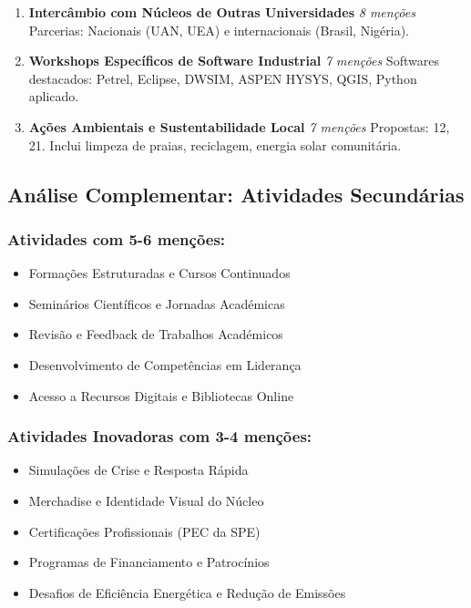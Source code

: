 \documentclass[12pt,a4paper]{article}
\begin{document}
\begin{enumerate}[itemsep=0.3cm, font=\bfseries]
\item \textbf{Intercâmbio com Núcleos de Outras Universidades} \quad \textit{8 menções}
\newline Parcerias: Nacionais (UAN, UEA) e internacionais (Brasil, Nigéria).

\item \textbf{Workshops Específicos de Software Industrial} \quad \textit{7 menções}
\newline Softwares destacados: Petrel, Eclipse, DWSIM, ASPEN HYSYS, QGIS, Python aplicado.

\item \textbf{Ações Ambientais e Sustentabilidade Local} \quad \textit{7 menções}
\newline Propostas: 12, 21. Inclui limpeza de praias, reciclagem, energia solar comunitária.

\end{enumerate}

\newpage

\subsection{Análise Complementar: Atividades Secundárias}

\subsubsection*{Atividades com 5-6 menções:}
\begin{itemize}[itemsep=0.2cm]
    \item Formações Estruturadas e Cursos Continuados
    \item Seminários Científicos e Jornadas Académicas
    \item Revisão e Feedback de Trabalhos Académicos
    \item Desenvolvimento de Competências em Liderança
    \item Acesso a Recursos Digitais e Bibliotecas Online
\end{itemize}

\subsubsection*{Atividades Inovadoras com 3-4 menções:}
\begin{itemize}[itemsep=0.2cm]
    \item Simulações de Crise e Resposta Rápida
    \item Merchadise e Identidade Visual do Núcleo
    \item Certificações Profissionais (PEC da SPE)
    \item Programas de Financiamento e Patrocínios
    \item Desafios de Eficiência Energética e Redução de Emissões
\end{itemize}
\end{document}

